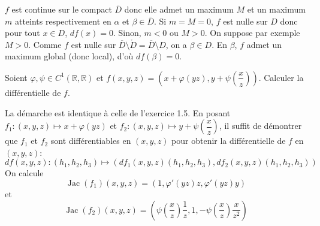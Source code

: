 \documentclass{fancybook}
\begin{document}
$f$ est continue sur le compact $\overline D$ donc elle admet un maximum $M$ et un maximum $m$ atteints respectivement en $\alpha$ et $\beta \in \overline D$.\newline
Si $m=M=0$, $f$ est nulle sur $D$ donc pour tout $x\in D$, $df(x)=0$.\newline
Sinon, $m<0$ ou $M>0$. On suppose par exemple $M>0$. Comme $f$ est nulle sur $\overline D\setminus \mathring D = \overline D\setminus D$, on a $\beta \in D$. En $\beta$, $f$ admet un maximum global (donc local), d'où $df(\beta)=0$. 

\begin{exercice}
Soient $\varphi,\psi\in C^1(\mathbb R, \mathbb R)$ et $f(x,y,z)=(x+\varphi(yz),y+\psi(\dfrac xz))$.\newline
Calculer la différentielle de $f$.
\end{exercice}
La démarche est identique à celle de l'exercice 1.5. En posant $f_1:(x,y,z)\mapsto x+\varphi(yz)$ et $f_2:(x,y,z)\mapsto y+\psi(\dfrac xz)$, il suffit de démontrer que $f_1$ et $f_2$ sont différentiables en $(x,y,z)$ pour obtenir la différentielle de $f$ en $(x,y,z)$: $$df(x,y,z):(h_1,h_2,h_3)\mapsto (df_1(x,y,z)(h_1,h_2,h_3),df_2(x,y,z)(h_1,h_2,h_3))$$
On calcule $$\operatorname{Jac}(f_1)(x,y,z)=(1,\varphi'(yz)z,\varphi'(yz)y)$$ et $$\operatorname{Jac}(f_2)(x,y,z)=\left(\psi(\dfrac xz)\dfrac 1z,1,-\psi(\dfrac xz) \dfrac{x}{z^2} \right)$$
\end{document}
